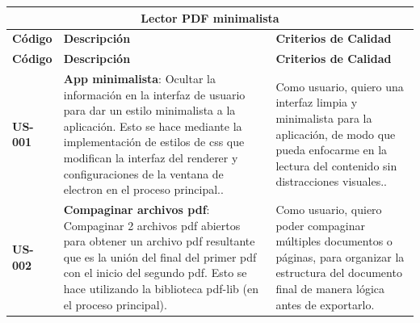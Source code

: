 \begin{longtable}{|l||p{7cm}|p{4.5cm}|}

\multicolumn{3}{c}{Lector PDF minimalista}\\
\hline
\textbf{Código} & \textbf{Descripción} & \textbf{Criterios de Calidad}\\
\hline\hline
\endfirsthead
\hline
\textbf{Código} & \textbf{Descripción} & \textbf{Criterios de Calidad}\\
\hline\hline
\endhead

\textbf{US-001} & \textbf{App minimalista}: Ocultar la información en la interfaz de usuario para dar un estilo minimalista a la aplicación. Esto se hace mediante la implementación de estilos de css que modifican la interfaz del renderer y configuraciones de la ventana de electron en el proceso principal..& Como usuario, quiero una interfaz limpia y minimalista para la aplicación, de modo que pueda enfocarme en la lectura del contenido sin distracciones visuales..\\
\hline
\textbf{US-002} & \textbf{Compaginar archivos pdf}: Compaginar 2 archivos pdf abiertos para obtener un archivo pdf resultante que es la unión del final del primer pdf con el inicio del segundo pdf. Esto se hace utilizando la biblioteca pdf-lib (en el proceso principal).  & Como usuario, quiero poder compaginar múltiples documentos o páginas, para organizar la estructura del documento final de manera lógica antes de exportarlo.\\
\hline

\end{longtable}
